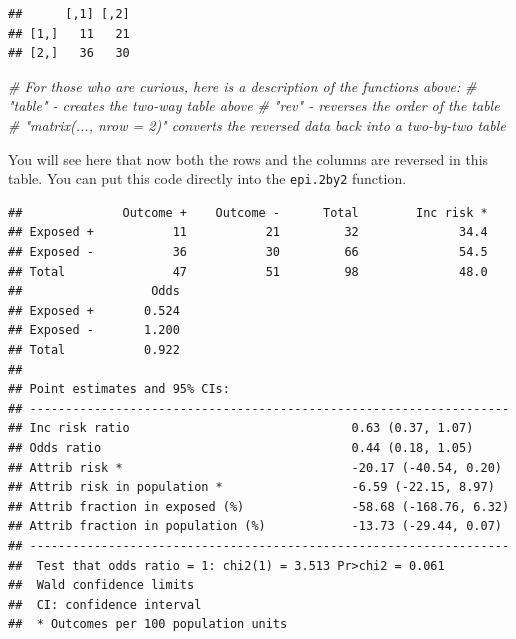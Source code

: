 \documentclass[]{book}
\newenvironment{Shaded}{\begin{snugshade}}{\end{snugshade}}
\newcommand{\CommentTok}[1]{\textcolor[rgb]{0.56,0.35,0.01}{\textit{#1}}}
\newcommand{\DataTypeTok}[1]{\textcolor[rgb]{0.13,0.29,0.53}{#1}}
\newcommand{\DecValTok}[1]{\textcolor[rgb]{0.00,0.00,0.81}{#1}}
\newcommand{\KeywordTok}[1]{\textcolor[rgb]{0.13,0.29,0.53}{\textbf{#1}}}
\newcommand{\NormalTok}[1]{#1}
\newcommand{\OperatorTok}[1]{\textcolor[rgb]{0.81,0.36,0.00}{\textbf{#1}}}
\begin{document}
\begin{Shaded}
\end{Shaded}

\begin{verbatim}
##      [,1] [,2]
## [1,]   11   21
## [2,]   36   30
\end{verbatim}

\begin{Shaded}
\begin{Highlighting}[]
\CommentTok{# For those who are curious, here is a description of the functions above:}
\CommentTok{# "table" - creates the two-way table above}
\CommentTok{# "rev" - reverses the order of the table}
\CommentTok{# "matrix(..., nrow = 2)" converts the reversed data back into a two-by-two table}
\end{Highlighting}
\end{Shaded}

You will see here that now both the rows and the columns are reversed in this table. You can put this code directly into the \texttt{epi.2by2} function.

\begin{Shaded}
\end{Shaded}

\begin{verbatim}
##              Outcome +    Outcome -      Total        Inc risk *
## Exposed +           11           21         32              34.4
## Exposed -           36           30         66              54.5
## Total               47           51         98              48.0
##                  Odds
## Exposed +       0.524
## Exposed -       1.200
## Total           0.922
## 
## Point estimates and 95% CIs:
## -------------------------------------------------------------------
## Inc risk ratio                               0.63 (0.37, 1.07)
## Odds ratio                                   0.44 (0.18, 1.05)
## Attrib risk *                                -20.17 (-40.54, 0.20)
## Attrib risk in population *                  -6.59 (-22.15, 8.97)
## Attrib fraction in exposed (%)               -58.68 (-168.76, 6.32)
## Attrib fraction in population (%)            -13.73 (-29.44, 0.07)
## -------------------------------------------------------------------
##  Test that odds ratio = 1: chi2(1) = 3.513 Pr>chi2 = 0.061
##  Wald confidence limits
##  CI: confidence interval
##  * Outcomes per 100 population units
\end{verbatim}
\end{document}
